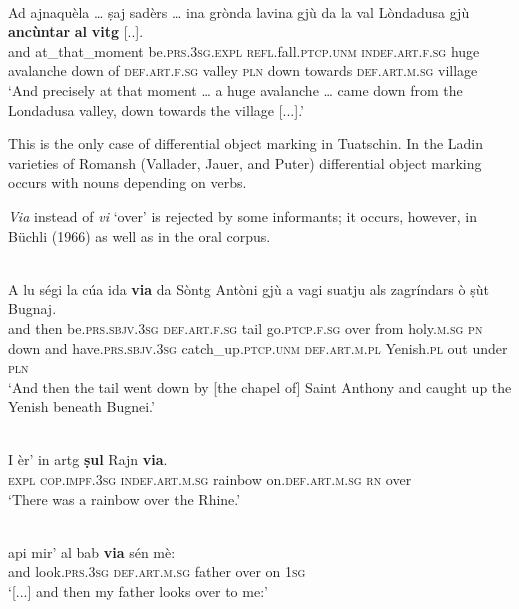 \ea
\label{}
\\
\gll    Ad ajnaquèla … ṣaj sadèrs … ina grònda lavina gjù da la val Lòndadusa gjù \textbf{ancùntar} \textbf{al} \textbf{vitg} [..].\\
and at\_that\_moment {} be.\textsc{prs.3sg.expl} \textsc{refl.}fall.\textsc{ptcp.unm} {} \textsc{indef.art.f.sg} huge avalanche down of \textsc{def.art.f.sg} valley \textsc{pln} down towards \textsc{def.art.m.sg} village\\
\glt `And precisely at that moment … a huge avalanche … came down from the Londadusa valley, down towards the village [...].'
\z

This is the only case of differential object marking in Tuatschin. In the Ladin varieties of Romansh (Vallader, Jauer, and Puter) differential object marking occurs with nouns depending on verbs.

\textit{Via} instead of \textit{vi} `over' is rejected by some informants; it occurs, however, in Büchli (1966) as well as in the oral corpus.

\ea
\label{ex:via1}
 {\citealt[132]{Büchli1966}}\\
\gll A lu ségi la cúa ida \textbf{via} da Sòntg Antòni gjù a vagi suatju als zagríndars ò ṣùt Bugnaj.\\
and then be.\textsc{prs.sbjv.3sg} \textsc{def.art.f.sg} tail go.\textsc{ptcp.f.sg} over from holy.\textsc{m.sg} \textsc{pn} down and have.\textsc{prs.sbjv.3sg} catch\_up.\textsc{ptcp.unm} \textsc{def.art.m.pl} Yenish.\textsc{pl} out under \textsc{pln}\\
\glt `And then the tail went down by [the chapel of] Saint Anthony and caught up the Yenish beneath Bugnei.'
\z

\ea
\label{ex:via2}
 {\citealt[15]{Büchli1966}}\\
\gll I èr' in artg \textbf{ṣul} Rajn \textbf{via}.\\
\textsc{expl} \textsc{cop.impf.3sg} \textsc{indef.art.m.sg} rainbow on.\textsc{def.art.m.sg} \textsc{rn} over\\
\glt `There was a rainbow over the Rhine.'
\z

\ea
\label{ex:via3}
\\
\gll  [...] api mir’ al bab \textbf{via} sén mè:\\
{} and look.\textsc{prs.3sg} \textsc{def.art.m.sg} father over on \textsc{1sg} \\
\glt `[...] and then my father looks over to me:'
\z

